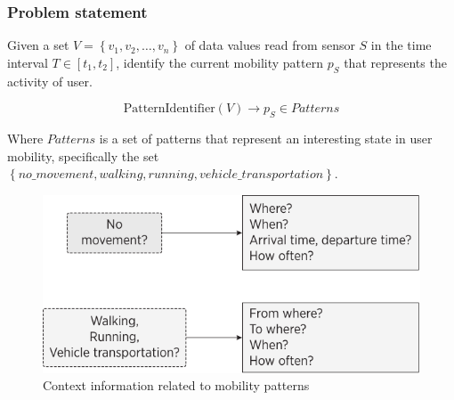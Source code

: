 \documentclass[compress,9pt,xcolor={dvipsnames,table}]{beamer}
\begin{document}
\begin{frame}\frametitle{Problem statement}
\begin{tcolorbox}[title=Problem statement: Mobility pattern identification,colframe=PineGreen]
\small
Given a set $V = \left\{v_{1}, v_{2}, \dotsc, v_{n}\right\}$ of data values read from sensor $S$ in the time interval $T  \in [t_{1}, t_{2}]$, identify the current mobility pattern $p_{S}$ that represents the activity of user.

\begin{equation}
  \text{PatternIdentifier}( V ) \longrightarrow{} p_{S} \in Patterns
\end{equation}

Where $Patterns$ is a set of patterns that represent an interesting state in user mobility, specifically the set $\left\{no\_movement, walking, running, vehicle\_transportation\right\}$.

\begin{figure}[tb]
  \centering
  \includegraphics[scale=0.5]{../../../resources/images/vectors/mobility-patterns-implications}
  \caption{Context information related to mobility patterns}
  \label{fig:mobility-patterns-implications}
\end{figure}

\end{tcolorbox}




\end{frame}
\end{document}
